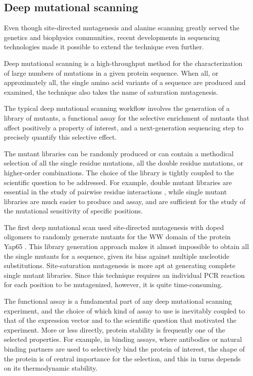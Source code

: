 \subsection{Deep mutational scanning}
Even though site-directed mutagenesis and alanine scanning greatly served the genetics and biophysics communities, recent developments in sequencing technologies made it possible to extend the technique even further.

Deep mutational scanning \parencite{Fowler2010, Fowler2014} is a high-throughput method for the characterization of large numbers of mutations in a given protein sequence.
When all, or approximately all, the single amino acid variants of a sequence are produced and examined, the technique also takes the name of saturation mutagenesis.

The typical deep mutational scanning workflow involves the generation of a library of mutants, a functional assay for the selective enrichment of mutants that affect positively a property of interest, and a next-generation sequencing step to precisely quantify this selective effect.

The mutant libraries can be randomly produced or can contain a methodical selection of all the single residue mutations, all the double residue mutations, or higher-order combinations.
The choice of the library is tightly coupled to the scientific question to be addressed.
For example, double mutant libraries are essential in the study of pairwise residue interactions \parencite[as in][]{Olson2014}, while single mutant libraries are much easier to produce and assay, and are sufficient for the study of the mutational sensitivity of specific positions.

The first deep mutational scan used site-directed mutagenesis with doped oligomers \parencite{Knight2003} to randomly generate mutants for the WW domain of the protein Yap65 \parencite{Fowler2010}.
This library generation approach makes it almost impossible to obtain all the single mutants for a sequence, given its bias against multiple nucleotide substitutions.
Site-saturation mutagenesis \parencite{Jain2014} is more apt at generating complete single mutant libraries.
Since this technique requires an individual PCR reaction for each position to be mutagenized, however, it is quite time-consuming.

The functional assay is a fundamental part of any deep mutational scanning experiment, and the choice of which kind of assay to use is inevitably coupled to that of the expression vector and to the scientific question that motivated the experiment.
More or less directly, protein stability is frequently one of the selected properties.
For example, in binding assays, where antibodies or natural binding partners are used to selectively bind the protein of interest, the shape of the protein is of central importance for the selection, and this in turns depends on its thermodynamic stability.


